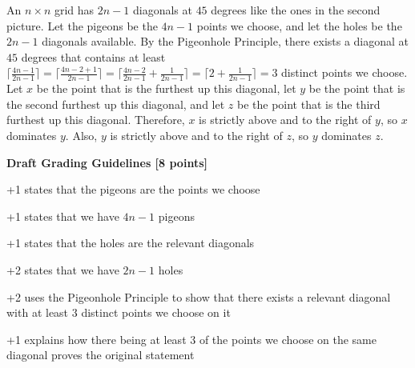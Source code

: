 \documentclass[12pt]{exam}
\begin{document}
\begin{solution} 
An $n \times n$ grid has $2n - 1$ diagonals at $45$ degrees like the ones in the second picture. Let the pigeons be the $4n - 1$ points we choose, and let the holes be the $2n - 1$ diagonals available. By the Pigeonhole Principle, there exists a diagonal at $45$ degrees that contains at least $\lceil \frac{4n - 1}{2n - 1} \rceil = \lceil \frac{4n - 2 + 1}{2n - 1} \rceil = \lceil \frac{4n - 2}{2n - 1} + \frac{1}{2n - 1} \rceil = \lceil 2 + \frac{1}{2n - 1} \rceil = 3$ distinct points we choose. Let $x$ be the point that is the furthest up this diagonal, let $y$ be the point that is the second furthest up this diagonal, and let $z$ be the point that is the third furthest up this diagonal. Therefore, $x$ is strictly above and to the right of $y$, so $x$ dominates $y$. Also, $y$ is strictly above and to the right of $z$, so $y$ dominates $z$.

\smallskip
\textbf{Draft Grading Guidelines [8 points]} 
\begin{gwguidelines}
    \item +1 states that the pigeons are the points we choose
    \item +1 states that we have $4n - 1$ pigeons
    \item +1 states that the holes are the relevant diagonals
    \item +2 states that we have $2n - 1$ holes
    \item +2 uses the Pigeonhole Principle to show that there exists a relevant diagonal with at least $3$ distinct points we choose on it
    \item +1 explains how there being at least $3$ of the points we choose on the same diagonal proves the original statement
\end{gwguidelines}
\end{solution}
\end{document}
